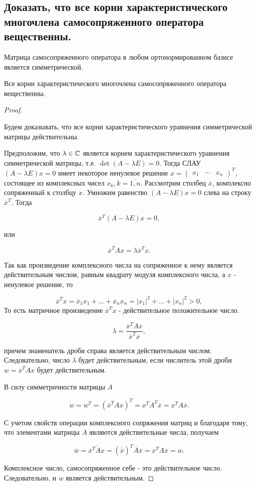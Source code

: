 \subsection{
    Доказать, что все корни характеристического многочлена самосопряженного оператора вещественны.
}

\begin{theorem}
    Матрица самосопряженного оператора в любом ортонормированном базисе является симметрической.
\end{theorem}

\begin{theorem}
    Все корни характеристического многочлена самосопряженного оператора вещественны.
\end{theorem}

\begin{proof}~

    Будем доказывать, что все корни характеристического уравнения симметрической матрицы действительны.

    Предположим, что $\lambda \in \mathbb{C}$ является корнем характеристического уравнения симметрической матрицы, т.е. $\det (A - \lambda E) = 0$. Тогда СЛАУ $(A - \lambda E)x = 0$ имеет некоторое ненулевое решение $x = \begin{pmatrix} x_1 & \cdots & x_n \end{pmatrix} ^ T$, состоящее из комплексных чисел $x_k, k = \overline{1, n}$. Рассмотрим столбец $\overline{x}$, комплексно сопряженный к столбцу $x$. Умножим равенство $(A - \lambda E)x = 0$ слева на строку $\overline{x}^T$. Тогда

    $$\overline{x}^T(A - \lambda E)x = 0,$$

    или

    $$\overline{x}^TAx = \lambda \overline{x}^Tx.$$

    Так как произведение комплексного числа на сопряженное к нему является действительным числом, равным квадрату модуля комплексного числа, а $x$ - ненулевое решение, то
    
    $$\overline{x}^Tx = \overline{x}_1x_1 + \ldots + \overline{x}_nx_n = |x_1|^2 + \ldots + |x_n|^2 > 0,$$
    То есть матричное произведение $\overline{x}^Tx$ - действительное положительное число.

    $$\lambda = \frac{\overline{x}^TAx}{\overline{x}^Tx},$$

    причем знаменатель дроби справа является действительным числом. Следовательно, число $\lambda$ будет действительным, если числитель этой дроби $w = \overline{x}^TAx$ будет действительным.

    В силу симметричности матрицы $A$

    $$w = w^T = (\overline{x}^TAx)^T = x^TA^T\overline{x} = x^TA\overline{x}.$$

    С учетом свойств операции комплексного сопряжения матриц и благодаря тому, что элементами матрицы $A$ являются действительные числа, получаем

    $$\overline{w} = \overline{\overline{x}^TAx} = (\overline{\overline{x}})^T\overline{A}\overline{x} = x^TA\overline{x} = w.$$

    Комплексное число, самосопряженное себе - это действительное число. Следовательно, и $w$ является действительным.
\end{proof}
